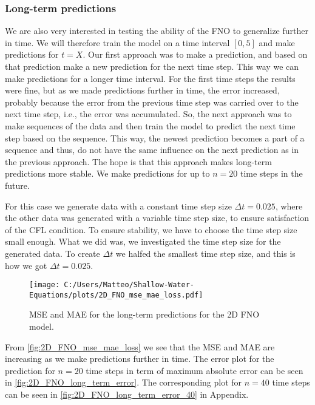 \subsubsection*{Long-term predictions}
We are also very interested in testing the ability of the FNO to generalize further in time.
We will therefore train the model on a time interval $[0, 5]$ and make predictions for $t = X$.
Our first approach was to make a prediction, and based on that prediction make a new prediction for the next time step.
This way we can make predictions for a longer time interval.
For the first time steps the results were fine, but as we made predictions further in time, the error increased, probably because the error from the previous time step was carried over to the next time step, i.e., the error was accumulated.
So, the next approach was to make sequences of the data and then train the model to predict the next time step based on the sequence. 
This way, the newest prediction becomes a part of a sequence and thus, do not have the same influence on the next prediction as in the previous approach.
The hope is that this approach makes long-term predictions more stable.
We make predictions for up to $n = 20$ time steps in the future.

For this case we generate data with a constant time step size $\Delta t = 0.025$, where the other data was generated with a variable time step size, to ensure satisfaction of the CFL condition.
To ensure stability, we have to choose the time step size small enough. 
What we did was, we investigated the time step size for the generated data. To create $\Delta t$ we halfed the smallest time step size, and this is how we got $\Delta t = 0.025$.


\begin{figure}[H]
    \centering
    \texttt{[image: C:/Users/Matteo/Shallow-Water-Equations/plots/2D\_FNO\_mse\_mae\_loss.pdf]}
    \caption{MSE and MAE for the long-term predictions for the 2D FNO model.}\label{fig:2D_FNO_mse_mae_loss}
\end{figure}
From \autoref{fig:2D_FNO_mse_mae_loss} we see that the MSE and MAE are increasing as we make predictions further in time.
The error plot for the prediction for $n = 20$ time steps in term of maximum absolute error can be seen in \autoref{fig:2D_FNO_long_term_error}.
The corresponding plot for $n = 40$ time steps can be seen in \autoref{fig:2D_FNO_long_term_error_40} in Appendix. 

